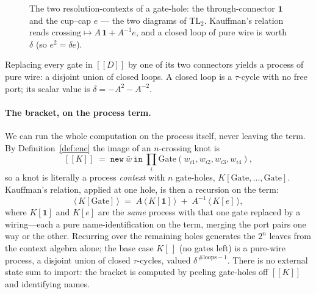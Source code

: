 \documentclass[11pt]{article}
\theoremstyle{definition}
\newcommand{\enc}[1]{[\![ #1 ]\!]}
\begin{document}
\begin{figure}[htb]
\centering
{}
\caption{The two resolution-contexts of a gate-hole: the through-connector
$\mathbf{1}$ and the cup--cap $e$ --- the two diagrams of $\mathrm{TL}_2$. Kauffman's
relation reads $\text{crossing}\mapsto A\,\mathbf{1}+A^{-1}e$, and a closed loop of
pure wire is worth $\delta$ (so $e^2=\delta e$).}
\label{fig:smoothings}
\end{figure}
Replacing every gate in $\enc{D}$ by one of its two connectors yields a process of
pure wire: a disjoint union of closed loops. A closed loop is a $\tau$-cycle with
no free port; its scalar value is $\delta = -A^2 - A^{-2}$.

\paragraph{The bracket, on the process term.}
We can run the whole computation on the process itself, never leaving the term. By
Definition~\ref{def:enc} the image of an $n$-crossing knot is
\[
\enc{K} \;=\; \mathtt{new}\ \bar w\ \mathtt{in}\ \textstyle\prod_{i}\mathrm{Gate}(w_{i1},w_{i2},w_{i3},w_{i4}),
\]
so a knot is literally a process \emph{context} with $n$ gate-holes,
$K[\mathrm{Gate},\dots,\mathrm{Gate}]$. Kauffman's relation, applied at one hole, is
then a recursion on the term:
\[
\bigl\langle\, K[\mathrm{Gate}]\,\bigr\rangle
   \;=\; A\,\bigl\langle\, K[\mathbf{1}]\,\bigr\rangle
   \;+\; A^{-1}\,\bigl\langle\, K[e]\,\bigr\rangle,
\]
where $K[\mathbf{1}]$ and $K[e]$ are the \emph{same} process with that one gate
replaced by a wiring---each a pure name-identification on the term, merging the port
pairs one way or the other. Recurring over the remaining holes generates the $2^{n}$
leaves from the context algebra alone; the base case $K[\,]$ (no gates left) is a
pure-wire process, a disjoint union of closed $\tau$-cycles, valued
$\delta^{\,\#\mathrm{loops}-1}$. There is no external state sum to import: the bracket
is computed by peeling gate-holes off $\enc{K}$ and identifying names.
\end{document}
